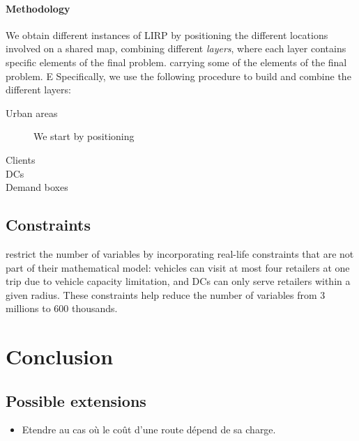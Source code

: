 \documentclass[a4paper,10pt]{article}
\begin{document}
\begin{linenumbers}
\paragraph{Methodology}
We obtain different instances of LIRP by positioning the different locations involved on a shared map, combining different {\em layers}, where each layer contains specific elements of the final problem.
carrying some of the elements of the final problem.
E
Specifically, we use the following procedure to build and combine the different layers:
\begin{description}
    \item[Urban areas] We start by positioning
    \item[Clients]
    \item[DCs]
    \item[Demand boxes]
\end{description}

\subsection{Constraints}

 \cite{Zheng2019} restrict the number of variables by incorporating real-life constraints that are not part of their mathematical model: 
 vehicles can visit at most four retailers at one trip due to vehicle capacity limitation, and DCs can only serve retailers within a given radius. 
 These constraints help reduce the number of variables from 3 millions to 600 thousands.
 


\section{Conclusion}


\subsection*{Possible extensions}
\begin{itemize}
	\item Etendre au cas où le coût d'une route dépend de sa charge.
\end{itemize}


\end{linenumbers}

\newpage
%


\end{document}
